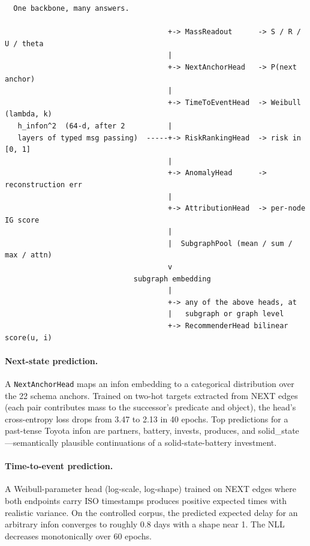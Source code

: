 \documentclass[11pt,a4paper]{article}
\begin{document}
\begin{verbatim}
  One backbone, many answers.

                                      +-> MassReadout      -> S / R / U / theta
                                      |
                                      +-> NextAnchorHead   -> P(next anchor)
                                      |
                                      +-> TimeToEventHead  -> Weibull (lambda, k)
   h_infon^2  (64-d, after 2          |
   layers of typed msg passing)  -----+-> RiskRankingHead  -> risk in [0, 1]
                                      |
                                      +-> AnomalyHead      -> reconstruction err
                                      |
                                      +-> AttributionHead  -> per-node IG score
                                      |
                                      |  SubgraphPool (mean / sum / max / attn)
                                      v
                              subgraph embedding
                                      |
                                      +-> any of the above heads, at
                                      |   subgraph or graph level
                                      +-> RecommenderHead bilinear score(u, i)
\end{verbatim}

\paragraph{Next-state prediction.} A \texttt{NextAnchorHead}
maps an infon embedding to a categorical distribution over the
22 schema anchors. Trained on two-hot targets extracted from NEXT
edges (each pair contributes mass to the successor's predicate
and object), the head's cross-entropy loss drops from 3.47 to
2.13 in 40 epochs. Top predictions for a past-tense Toyota infon
are partners, battery, invests, produces, and solid\_state
---semantically plausible continuations of a solid-state-battery
investment.

\paragraph{Time-to-event prediction.} A Weibull-parameter head
(log-scale, log-shape) trained on NEXT edges where both endpoints
carry ISO timestamps produces positive expected times with
realistic variance. On the controlled corpus, the predicted
expected delay for an arbitrary infon converges to roughly 0.8
days with a shape near 1. The NLL decreases monotonically over
60 epochs.
\end{document}

